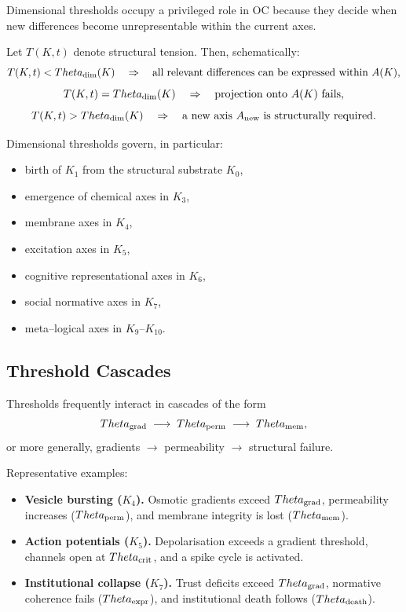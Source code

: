 Dimensional thresholds occupy a privileged role in OC because they decide when
new differences become unrepresentable within the current axes.

Let \(T(K,t)\) denote structural tension.
Then, schematically:
\[
  T(K,t) < \Theta_{\rm dim}(K)
   \quad\Rightarrow\quad
   \text{all relevant differences can be expressed within } A(K),
\]
\[
  T(K,t) = \Theta_{\rm dim}(K)
   \quad\Rightarrow\quad
   \text{projection onto } A(K)\ \text{fails},
\]
\[
  T(K,t) > \Theta_{\rm dim}(K)
   \quad\Rightarrow\quad
   \text{a new axis } A_{\rm new} \text{ is structurally required}.
\]

Dimensional thresholds govern, in particular:
\begin{itemize}
    \item birth of \(K_1\) from the structural substrate \(K_0\),
    \item emergence of chemical axes in \(K_3\),
    \item membrane axes in \(K_4\),
    \item excitation axes in \(K_5\),
    \item cognitive representational axes in \(K_6\),
    \item social normative axes in \(K_7\),
    \item meta–logical axes in \(K_9\)–\(K_{10}\).
\end{itemize}

\subsection{Threshold Cascades}

Thresholds frequently interact in cascades of the form
\[
  \Theta_{\rm grad}
  \;\longrightarrow\;
  \Theta_{\rm perm}
  \;\longrightarrow\;
  \Theta_{\rm mem},
\]
or more generally, gradients \(\to\) permeability \(\to\) structural failure.

Representative examples:

\begin{itemize}
    \item \textbf{Vesicle bursting (\(K_4\)).}  
          Osmotic gradients exceed \(\Theta_{\rm grad}\), permeability increases
          (\(\Theta_{\rm perm}\)), and membrane integrity is lost
          (\(\Theta_{\rm mem}\)).
    \item \textbf{Action potentials (\(K_5\)).}  
          Depolarisation exceeds a gradient threshold, channels open at
          \(\Theta_{\rm crit}\), and a spike cycle is activated.
    \item \textbf{Institutional collapse (\(K_7\)).}  
          Trust deficits exceed \(\Theta_{\rm grad}\), normative coherence
          fails (\(\Theta_{\rm expr}\)), and institutional death follows
          (\(\Theta_{\rm death}\)).
\end{itemize}

